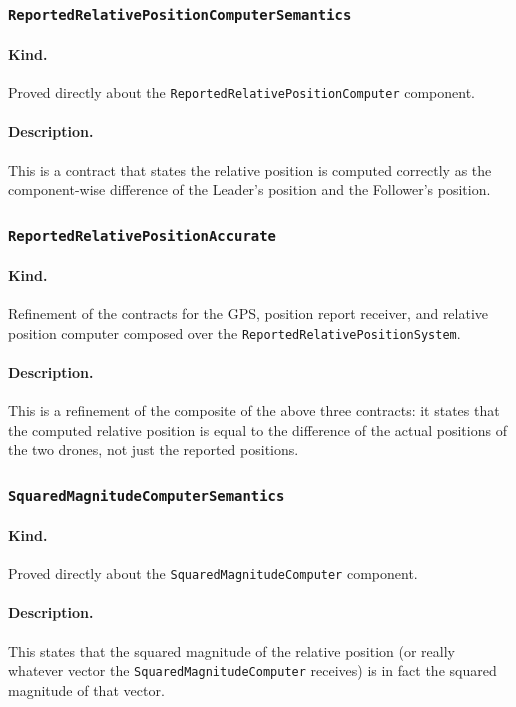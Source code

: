 \documentclass{article}
\begin{document}
\subsubsection{\texttt{ReportedRelativePositionComputerSemantics}}

\paragraph{Kind.} Proved directly about the \texttt{ReportedRelativePositionComputer} component.

\paragraph{Description.} This is a contract that states the relative position is computed correctly as the component-wise difference of the Leader's position and the Follower's position. 

\subsubsection{\texttt{ReportedRelativePositionAccurate}}

\paragraph{Kind.} Refinement of the contracts for the GPS, position report receiver, and relative position computer composed over the \texttt{ReportedRelativePositionSystem}.

\paragraph{Description.} This is a refinement of the composite of the above three contracts: it states that the computed relative position is equal to the difference of the actual positions of the two drones, not just the reported positions. 

\subsubsection{\texttt{SquaredMagnitudeComputerSemantics}}

\paragraph{Kind.} Proved directly about the \texttt{SquaredMagnitudeComputer} component.

\paragraph{Description.} This states that the squared magnitude of the relative position (or really whatever vector the \texttt{SquaredMagnitudeComputer} receives) is in fact the squared magnitude of that vector. 
\end{document}

